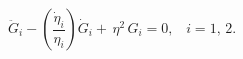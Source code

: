 \begin{equation}
\ddot{G}_{i}-\left( \frac{\dot{\eta}_{i}}{\eta _{i}}\right) \dot{G}%
_{i}+\,\eta ^{2}\,G_{i}=0,\,\,\,\,\,i=1,\,2.  \label{2}
\end{equation}

